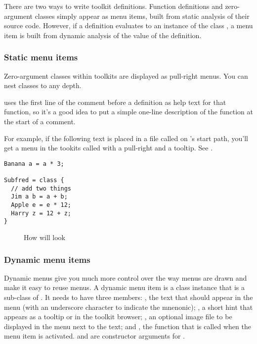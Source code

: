 There are two ways to write toolkit definitions. Function definitions and
zero-argument classes simply appear as menu items, built from static analysis
of their source code. However, if a definition evaluates to an instance of the
class , a menu item is built from dynamic analysis of the value of
the definition.

\subsubsection{Static menu items}

Zero-argument classes within toolkits are displayed
as pull-right menus. You can nest classes to any depth. 

\nip{} uses the first line of the comment before a definition as
help text for that function, so it's a good idea to put a simple one-line
description of the function at the start of a comment.

For example, if the following text is placed in a file called 
on \nip{}'s start path, you'll get a menu in the tookits called  with
a pull-right and a tooltip. See .

\begin{verbatim}
Banana a = a * 3;

Subfred = class { 
  // add two things
  Jim a b = a + b;
  Apple e = e * 12;
  Harry z = 12 + z;
}
\end{verbatim}

\begin{figure}
\caption{How  will look}
\end{figure}

\subsubsection{Dynamic menu items}

Dynamic menus give you much more control over the way menus are drawn and make
it easy to reuse menus. A dynamic menu item is a class instance that is a
sub-class of . It needs to have three members: , the
text that should appear in the menu (with an underscore character to indicate
the mnenonic); , a short hint that appears as a tooltip or in
the toolkit browser; , an optional image file to be displayed in the 
menu next to the text; and , the function that is called when
the menu item is activated.  and  are constructor
arguments for .

